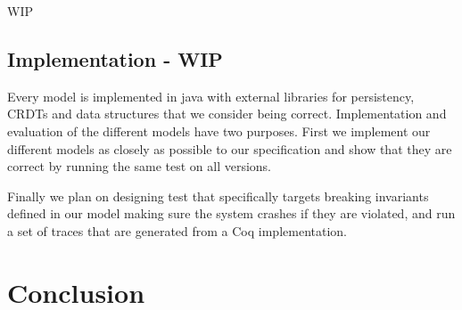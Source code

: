 \documentclass[systeme,french,english]{compas2022}
\begin{document}
WIP


\subsection{Implementation - WIP}

Every model is implemented in java with external libraries for persistency, CRDTs and data structures that we consider being correct.
Implementation and evaluation of the different models have two purposes.
First we implement our different models as closely as possible to our specification and show that they are correct by running the same test on all versions.

Finally we plan on designing test that specifically targets breaking invariants defined in our model making sure the system crashes if they are violated, and run a set of traces that are generated from a Coq implementation.



\section{Conclusion}



\end{document}

